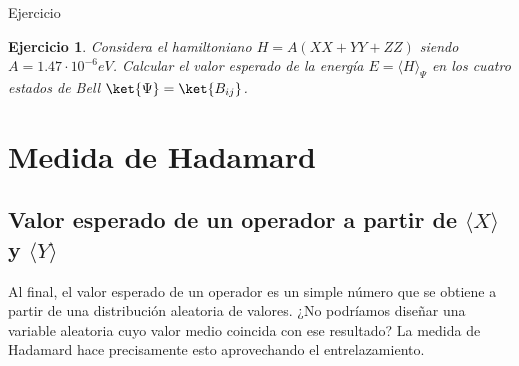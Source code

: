 \documentclass[a4paper,11pt]{book} %
\newtheorem{ejercicio_contador}{Ejercicio}
\newcommand{\Ejercicio}[1]{
		\begin{mybox_gray}{Ejercicio} 
			\begin{ejercicio_contador}
				 #1 
			\end{ejercicio_contador} 
		\end{mybox_gray}
	}
\numberwithin{equation}{chapter}
\begin{document}
	\Ejercicio{
	Considera el hamiltoniano $H=A(X X+Y Y+Z Z)$ siendo $A=1.47\cdot 10^{-6}eV$. Calcular el 
	valor esperado de la energía $E = \langle H\rangle_\Psi$  en los cuatro estados de Bell 
	$\ket{\Psi} = \ket{B_{ij}}$. 
	}



    \section{Medida de Hadamard}
    
    	\subsection{Valor esperado de un operador a partir de $\langle X \rangle$ y $\langle Y\rangle$}

Al final, el valor esperado de un operador es un simple número que se obtiene a partir de una distribución aleatoria de valores. 
¿No podríamos diseñar una variable aleatoria cuyo valor medio coincida con ese resultado? 
La medida de Hadamard hace precisamente esto aprovechando el entrelazamiento.
\end{document}
